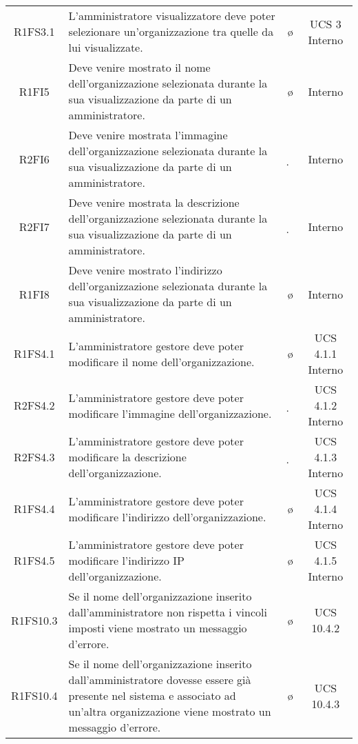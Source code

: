 {\begin{longtable}{ c C{6.5cm} c c}
R1FS3.1 & L'amministratore visualizzatore deve poter selezionare un'organizzazione tra quelle da lui visualizzate. & \o & UCS 3 Interno\\

R1FI5 & Deve venire mostrato il nome dell'organizzazione selezionata durante la sua visualizzazione da parte di un amministratore. & \o & Interno\\

R2FI6 & Deve venire mostrata l'immagine dell'organizzazione selezionata durante la sua visualizzazione da parte di un amministratore. & \d & Interno\\

R2FI7 & Deve venire mostrata la descrizione dell'organizzazione selezionata durante la sua visualizzazione da parte di un amministratore. & \d & Interno\\

R1FI8 & Deve venire mostrato l'indirizzo dell'organizzazione selezionata durante la sua visualizzazione da parte di un amministratore. & \o & Interno\\


R1FS4.1 & L'amministratore gestore deve poter modificare il nome dell'organizzazione. & \o & UCS 4.1.1 Interno\\

R2FS4.2 & L'amministratore gestore deve poter modificare l'immagine dell'organizzazione. & \d & UCS 4.1.2 Interno\\

R2FS4.3 & L'amministratore gestore deve poter modificare la descrizione dell'organizzazione. & \d & UCS 4.1.3 Interno\\

R1FS4.4 & L'amministratore gestore deve poter modificare l'indirizzo dell'organizzazione. & \o & UCS 4.1.4 Interno\\

R1FS4.5 & L'amministratore gestore deve poter modificare l'indirizzo IP dell'organizzazione. & \o & UCS 4.1.5 Interno\\

R1FS10.3 & Se il nome dell'organizzazione inserito dall'amministratore non rispetta i vincoli imposti viene mostrato un messaggio d'errore. & \o & UCS 10.4.2\\

R1FS10.4 & Se il nome dell'organizzazione inserito dall'amministratore dovesse essere già presente nel sistema e associato ad un'altra organizzazione viene mostrato un messaggio d'errore. & \o & UCS 10.4.3\\


\end{longtable}}
